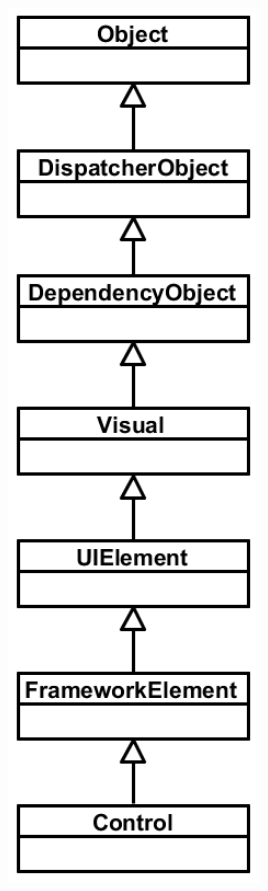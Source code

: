 \documentclass[xetex,mathserif,serif]{beamer}
\begin{document}
\begin{frame}[fragile]
\begin{columns}
\begin{column}{0.3\textwidth}
\begin{center}
                    \includegraphics[width=0.5\textwidth]{wpfClassStructure.png}
                \end{center}
            \end{column}
        \end{columns}
    \end{frame}
\end{document}
